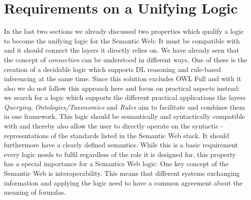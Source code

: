 \section{Requirements on a Unifying Logic}
In the last two sections we already discussed two properties which qualify a logic to become the unifying logic for the Semantic Web: It must be compatible with \rdf and it should 
 connect the layers it directly relies on. We have already seen that the concept of \emph{connection} can be understood in different ways. One of these is the creation of a 
 decidable logic which supports DL reasoning and rule-based inferencing at the same time. Since this solution excludes OWL Full and with it also \rdf we do not follow this approach here 
 and focus on practical aspects instead: we search for a logic which supports the different practical applications the layers \emph{Querying}, \emph{Ontologies/Taxonomies} and 
 \emph{Rules} aim to facilitate and combines them in one framework. This logic should be semantically and syntactically compatible with \rdf and
 thereby also allow the user to directly operate 
 on the syntactic \rdf-representations 
 of the standards listed in the Semantic Web stack. It should furthermore have a clearly defined semantics. While this is a basic requirement every logic needs to fulfil 
 regardless of the role it is designed for, this property has a special importance for a Semantics Web logic: One key concept of 
the Semantic Web is interoperability. This means that different systems exchanging information and applying the logic need to have a common agreement about 
the meaning of formulas.
 
